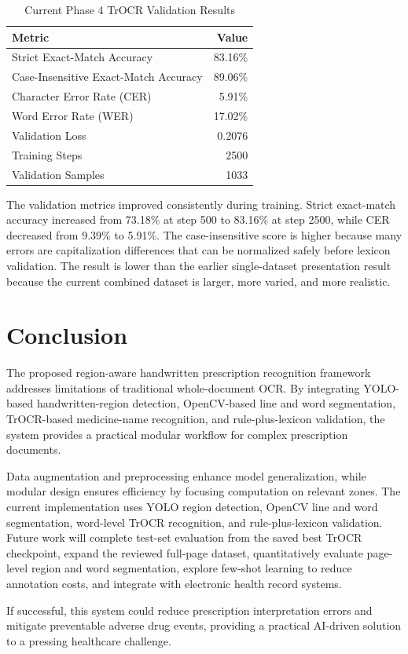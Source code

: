 \documentclass[twocolumn,10pt]{article}
\begin{document}
\begin{table}[h]
\centering
\caption{Current Phase 4 TrOCR Validation Results}
\label{tab:phase4_ocr_results}
\renewcommand{\arraystretch}{1.2}
\small
\begin{tabularx}{\columnwidth}{Xr}
\toprule
\textbf{Metric} & \textbf{Value} \\
\midrule
Strict Exact-Match Accuracy & 83.16\% \\
Case-Insensitive Exact-Match Accuracy & 89.06\% \\
Character Error Rate (CER) & 5.91\% \\
Word Error Rate (WER) & 17.02\% \\
Validation Loss & 0.2076 \\
Training Steps & 2500 \\
Validation Samples & 1033 \\
\bottomrule
\end{tabularx}
\end{table}

The validation metrics improved consistently during training. Strict exact-match accuracy increased from 73.18\% at step 500 to 83.16\% at step 2500, while CER decreased from 9.39\% to 5.91\%. The case-insensitive score is higher because many errors are capitalization differences that can be normalized safely before lexicon validation. The result is lower than the earlier single-dataset presentation result because the current combined dataset is larger, more varied, and more realistic.

\section{Conclusion}
The proposed region-aware handwritten prescription recognition framework addresses limitations of traditional whole-document OCR. By integrating YOLO-based handwritten-region detection, OpenCV-based line and word segmentation, TrOCR-based medicine-name recognition, and rule-plus-lexicon validation, the system provides a practical modular workflow for complex prescription documents.

Data augmentation and preprocessing enhance model generalization, while modular design ensures efficiency by focusing computation on relevant zones. The current implementation uses YOLO region detection, OpenCV line and word segmentation, word-level TrOCR recognition, and rule-plus-lexicon validation. Future work will complete test-set evaluation from the saved best TrOCR checkpoint, expand the reviewed full-page dataset, quantitatively evaluate page-level region and word segmentation, explore few-shot learning to reduce annotation costs, and integrate with electronic health record systems.

If successful, this system could reduce prescription interpretation errors and mitigate preventable adverse drug events, providing a practical AI-driven solution to a pressing healthcare challenge.



\end{document}
